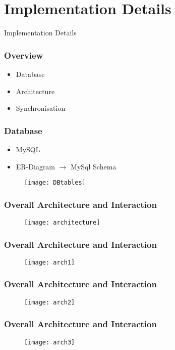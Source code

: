 \section{Implementation Details}
\begin{frame}
	\begin{center}
		\Huge Implementation Details
	\end{center}
\end{frame}
\begin{frame}
\frametitle{Overview}
\begin{itemize}
\item Database
\item Architecture
\item Synchronisation
\end{itemize}
\end{frame}

\begin{frame}
\frametitle{Database}
\begin{itemize}
	\item MySQL
	\item ER-Diagram $\rightarrow$ MySql Schema
\end{itemize}
	\begin{figure}
		\texttt{[image: DBtables]}
	\end{figure}
\end{frame}


\begin{frame}
	\frametitle{Overall Architecture and Interaction}
		\begin{figure}
		\centering
			\texttt{[image: architecture]}
		\end{figure}
\end{frame}

\begin{frame}
	\frametitle{Overall Architecture and Interaction}
	\begin{figure}
		\centering
		\texttt{[image: arch1]}
	\end{figure}
\end{frame}
\begin{frame}
	\frametitle{Overall Architecture and Interaction}
	\begin{figure}
		\centering
		\texttt{[image: arch2]}
	\end{figure}
\end{frame}
\begin{frame}
	\frametitle{Overall Architecture and Interaction}
	\begin{figure}
		\centering
		\texttt{[image: arch3]}
	\end{figure}
\end{frame}


